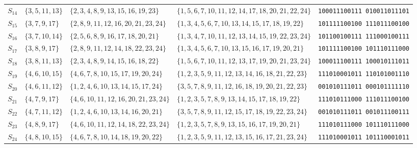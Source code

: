 \documentclass[aps,pra,reprint,superscriptaddress,longbibliography,nofootinbib,floatfix,10pt]{revtex4-2}
\theoremstyle{definition}
\begin{document}
\begin{longtable}{llllc}
$S_{14}$ & $\{3,5,11,13\}$ & $\{2,3,4,8,9,13,15,16,19,23\}$ & $\{1,5,6,7,10,11,12,14,17,18,20,21,22,24\}$ & \texttt{100011100111\,010011011101} \\
$S_{15}$ & $\{3,7,9,17\}$ & $\{2,8,9,11,12,16,20,21,23,24\}$ & $\{1,3,4,5,6,7,10,13,14,15,17,18,19,22\}$ & \texttt{101111100100\,111011100100} \\
$S_{16}$ & $\{3,7,10,14\}$ & $\{2,5,6,8,9,16,17,18,20,21\}$ & $\{1,3,4,7,10,11,12,13,14,15,19,22,23,24\}$ & \texttt{101100100111\,111000100111} \\*
$S_{17}$ & $\{3,8,9,17\}$ & $\{2,8,9,11,12,14,18,22,23,24\}$ & $\{1,3,4,5,6,7,10,13,15,16,17,19,20,21\}$ & \texttt{101111100100\,101110111000} \\*
$S_{18}$ & $\{3,8,11,13\}$ & $\{2,3,4,8,9,14,15,16,18,22\}$ & $\{1,5,6,7,10,11,12,13,17,19,20,21,23,24\}$ & \texttt{100011100111\,100010111011} \\*
$S_{19}$ & $\{4,6,10,15\}$ & $\{4,6,7,8,10,15,17,19,20,24\}$ & $\{1,2,3,5,9,11,12,13,14,16,18,21,22,23\}$ & \texttt{111010001011\,110101001110} \\*
$S_{20}$ & $\{4,6,11,12\}$ & $\{1,2,4,6,10,13,14,15,17,24\}$ & $\{3,5,7,8,9,11,12,16,18,19,20,21,22,23\}$ & \texttt{001010111011\,000101111110} \\*
$S_{21}$ & $\{4,7,9,17\}$ & $\{4,6,10,11,12,16,20,21,23,24\}$ & $\{1,2,3,5,7,8,9,13,14,15,17,18,19,22\}$ & \texttt{111010111000\,111011100100} \\*
$S_{22}$ & $\{4,7,11,12\}$ & $\{1,2,4,6,10,13,14,16,20,21\}$ & $\{3,5,7,8,9,11,12,15,17,18,19,22,23,24\}$ & \texttt{001010111011\,001011100111} \\*
$S_{23}$ & $\{4,8,9,17\}$ & $\{4,6,10,11,12,14,18,22,23,24\}$ & $\{1,2,3,5,7,8,9,13,15,16,17,19,20,21\}$ & \texttt{111010111000\,101110111000} \\*
$S_{24}$ & $\{4,8,10,15\}$ & $\{4,6,7,8,10,14,18,19,20,22\}$ & $\{1,2,3,5,9,11,12,13,15,16,17,21,23,24\}$ & \texttt{111010001011\,101110001011}
\end{longtable}
\endgroup
\end{document}
